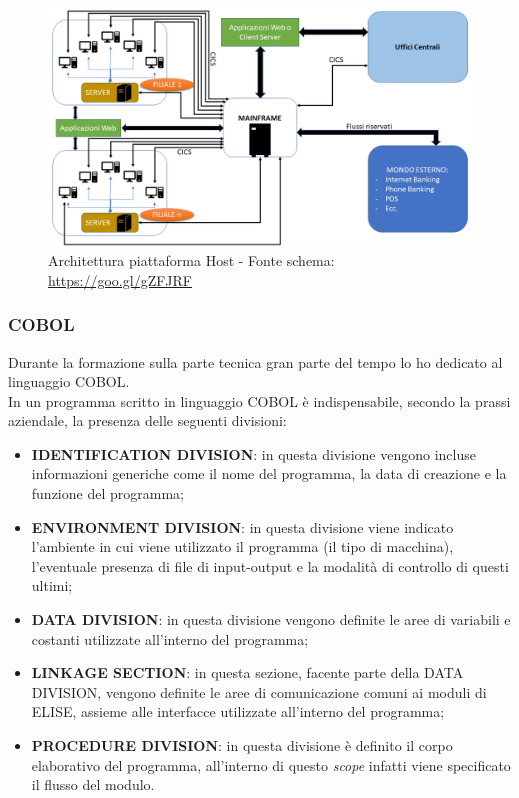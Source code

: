	\begin{figure}[H]
		\centering
	   	\includegraphics[width=1\textwidth]{immagini/Architettura}
	   	\caption{Architettura piattaforma Host - Fonte schema:\\ \tab \url{https://goo.gl/gZFJRF} }
	\end{figure}

	
\subsubsection{COBOL}

Durante la formazione sulla parte tecnica gran parte del tempo lo ho dedicato al linguaggio COBOL.\\

In un programma scritto in linguaggio COBOL è indispensabile, secondo la prassi aziendale, la presenza delle seguenti divisioni:
\begin{itemize}

\item \textbf{IDENTIFICATION DIVISION}: in questa divisione vengono incluse informazioni generiche come il nome del programma, la data di creazione e la funzione del programma;

\item \textbf{ENVIRONMENT DIVISION}: in questa divisione viene indicato l'ambiente in cui viene utilizzato il programma (il tipo di macchina), l'eventuale presenza di file di input-output e la modalità di controllo di questi ultimi;

\item \textbf{DATA DIVISION}: in questa divisione vengono definite le aree di variabili e costanti utilizzate all'interno del programma;

\item \textbf{LINKAGE SECTION}: in questa sezione, facente parte della DATA DIVISION, vengono definite le aree di comunicazione comuni ai moduli di ELISE, assieme alle interfacce utilizzate all'interno del programma;

\item \textbf{PROCEDURE DIVISION}: in questa divisione è definito il corpo elaborativo del programma, all'interno di questo \textit{scope} infatti viene specificato il flusso del modulo.
\end{itemize}

